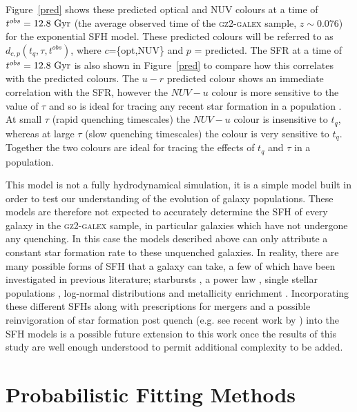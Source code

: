 Figure~\ref{pred} shows these predicted optical and NUV colours at a time of $t^{obs} = 12.8 ~\rm{Gyr}$ (the average observed time of the \textsc{gz2-galex} sample, $z \sim 0.076$) for the exponential SFH model. These predicted colours will be referred to as $d_{c,p}(t_{q}, \tau, t^{obs})$, where $c$=\{opt,NUV\} and $p$ = predicted. The SFR at a time of $t^{obs}=12.8~\rm{Gyr}$ is also shown in Figure~\ref{pred} to compare how this correlates with the predicted colours. The $u-r$ predicted colour shows an immediate correlation with the SFR, however the $NUV-u$ colour is more sensitive to the value of $\tau$ and so is ideal for tracing any recent star formation in a population . At small $\tau$ (rapid quenching timescales) the $NUV-u$ colour is insensitive to $t_{q}$, whereas at large $\tau$ (slow quenching timescales) the colour is very sensitive to $t_{q}$. Together the two colours are ideal for tracing the effects of $t_{q}$ and $\tau$ in a population. 

This model is not a fully hydrodynamical simulation, it is a simple model built in order to test our understanding of the evolution of galaxy populations. These models are therefore not expected to accurately determine the SFH of every galaxy in the \textsc{gz2-galex} sample, in particular galaxies which have not undergone any quenching. In this case the models described above can only attribute a constant star formation rate to these  unquenched galaxies. In reality, there are many possible forms of SFH that a galaxy can take, a few of which have been investigated in previous literature; starbursts \citep{Canalizo01}, a power law \citep{Glazebrook03}, single stellar populations \citep{Trager00, Sanchez06, Vazdekis10}, log-normal distributions \citep{abramson16} and metallicity enrichment \citep{deLucia14}. Incorporating these different SFHs along with prescriptions for mergers and a possible reinvigoration of star formation post quench (e.g. see recent work by \citealt{pontzen16}) into the SFH models is a possible future extension to this work once the results of this study are well enough understood to permit additional complexity to be added.

\section{Probabilistic Fitting Methods}\label{stats}


